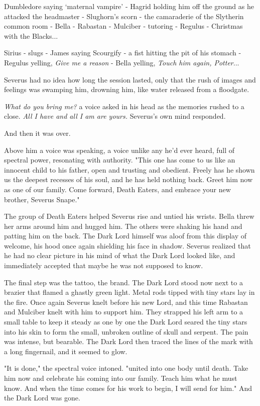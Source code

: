 Dumbledore saying `maternal vampire' - Hagrid holding him off the ground as he attacked the headmaster - Slughorn's scorn - the camaraderie of the Slytherin common room - Bella - Rabastan - Mulciber - tutoring - Regulus - Christmas with the Blacks...

Sirius - slugs - James saying Scourgify - a fist hitting the pit of his stomach - Regulus yelling, \emph{Give me a reason} - Bella yelling, \emph{Touch him again, Potter}...

Severus had no idea how long the session lasted, only that the rush of images and feelings was swamping him, drowning him, like water released from a floodgate.

\emph{What do you bring me?} a voice asked in his head as the memories rushed to a close. \emph{All I have and all I am are yours.} Severus's own mind responded.

And then it was over.

Above him a voice was speaking, a voice unlike any he'd ever heard, full of spectral power, resonating with authority. "This one has come to us like an innocent child to his father, open and trusting and obedient. Freely has he shown us the deepest recesses of his soul, and he has held nothing back. Greet him now as one of our family. Come forward, Death Eaters, and embrace your new brother, Severus Snape."

The group of Death Eaters helped Severus rise and untied his wrists. Bella threw her arms around him and hugged him. The others were shaking his hand and patting him on the back. The Dark Lord himself was aloof from this display of welcome, his hood once again shielding his face in shadow. Severus realized that he had no clear picture in his mind of what the Dark Lord looked like, and immediately accepted that maybe he was not supposed to know.

The final step was the tattoo, the brand. The Dark Lord stood now next to a brazier that flamed a ghastly green light. Metal rods tipped with tiny stars lay in the fire. Once again Severus knelt before his new Lord, and this time Rabastan and Mulciber knelt with him to support him. They strapped his left arm to a small table to keep it steady as one by one the Dark Lord seared the tiny stars into his skin to form the small, unbroken outline of skull and serpent. The pain was intense, but bearable. The Dark Lord then traced the lines of the mark with a long fingernail, and it seemed to glow.

"It is done," the spectral voice intoned. "united into one body until death. Take him now and celebrate his coming into our family. Teach him what he must know. And when the time comes for his work to begin, I will send for him." And the Dark Lord was gone.


